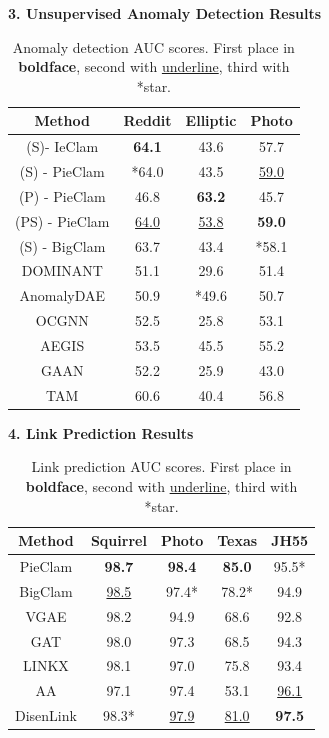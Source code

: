 \documentclass[final]{beamer}
\newlength{\colwidth}
\begin{document}
\begin{frame}[t]
\begin{columns}[t]
\begin{column}{\colwidth}
      \vspace{0.7em}
      
    \textbf{3. Unsupervised Anomaly Detection Results}
    \begin{table}
      \centering
      \small
      \begin{tabular}{|c|c|c|c|}
        \hline
        Method & Reddit & Elliptic & Photo \\
        \hline
        (S)- IeClam & \textbf{64.1} & 43.6 & 57.7 \\
        (S) - PieClam & *64.0 & 43.5 & \underline{59.0} \\
        (P) - PieClam & 46.8 & \textbf{63.2} & 45.7 \\
        (PS) - PieClam & \underline{64.0} & \underline{53.8} & \textbf{59.0} \\
        (S) - BigClam & 63.7 & 43.4 & *58.1 \\
        \hline
        DOMINANT & 51.1 & 29.6 & 51.4 \\
        AnomalyDAE & 50.9 & *49.6 & 50.7 \\
        OCGNN & 52.5 & 25.8 & 53.1 \\
        AEGIS & 53.5 & 45.5 & 55.2 \\
        GAAN & 52.2 & 25.9 & 43.0 \\
        TAM & 60.6 & 40.4 & 56.8 \\
        \hline
      \end{tabular}
      \caption{Anomaly detection AUC scores. First place in \textbf{boldface}, second with \underline{underline}, third with *star.}
    \end{table}

    \vspace{0.7em}

    \textbf{4. Link Prediction Results}
    \begin{table}
      \centering
      \small
      \begin{tabular}{|c|c|c|c|c|}
        \hline
        Method & Squirrel & Photo & Texas & JH55 \\
        \hline
        PieClam & \textbf{98.7} & \textbf{98.4} & \textbf{85.0} & 95.5* \\
        \hline
        BigClam & \underline{98.5} & 97.4* & 78.2* & 94.9 \\
        VGAE & 98.2 & 94.9 & 68.6 & 92.8 \\
        GAT & 98.0 & 97.3 & 68.5 & 94.3 \\
        LINKX & 98.1 & 97.0 & 75.8 & 93.4 \\
        AA & 97.1 & 97.4 & 53.1 & \underline{96.1} \\
        DisenLink & 98.3* & \underline{97.9} & \underline{81.0} & \textbf{97.5} \\
        \hline
      \end{tabular}
      \caption{Link prediction AUC scores. First place in \textbf{boldface}, second with \underline{underline}, third with *star.}
    \end{table}


\end{column}
\end{columns}
\end{frame}
\end{document}
